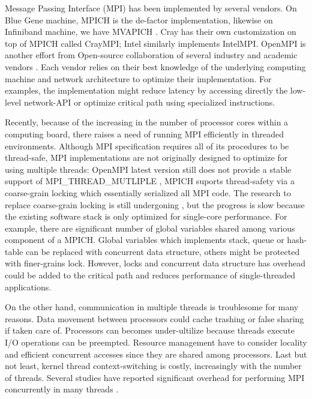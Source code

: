 Message Passing Interface (MPI) has been implemented by several vendors. On
Blue Gene machine, MPICH \cite{mpich} is the de-factor implementation, likewise
on Infiniband machine, we have MVAPICH \cite{mvapich}. Cray has their own
customization on top of MPICH called CrayMPI; Intel similarly implements
IntelMPI. OpenMPI is another effort from Open-source collaboration of several
industry and academic vendors \cite{openMPI}.  Each vendor relies on 
their best knowledge of the underlying computing machine and network
architecture to optimize their implementation. For examples, the implementation
might reduce latency by accessing directly the low-level network-API or
optimize critical path using specialized instructions.

Recently, because of the increasing in the number of processor cores within a
computing board, there raises a need of running MPI efficiently in threaded
environments. Although MPI specification requires all of its procedures to be
thread-safe, MPI implementations are not originally designed to optimize for
using multiple threads: OpenMPI latest version still does not
provide a stable support of MPI\_THREAD\_MUTLIPLE \cite{openmpifr},  MPICH suports thread-safety
via a coarse-grain locking which essentially serialized all MPI code. The
research to replace coarse-grain locking is still undergoning \cite{mpilock}, but the
progress is slow because the existing software stack is only optimized for
single-core performance. For example, there are significant number of global
variables shared among various component of a MPICH. Global variables which
implements stack, queue or hash-table can be replaced with concurrent data
structure, others might be protected with finer-grains lock.  However, locks
and concurrent data structure has overhead could be added to  the critical path
and reduces performance of single-threaded applications.

On the other hand, communication in multiple threads is troublesome for many
reasons. Data movement between processors could cache trashing or false sharing
if taken care of. Processors can becomes under-ultilize because threads execute
I/O operations can be preempted. Resource management have to consider locality
and efficient concurrent accesses since they are shared among processors. Last
but not least, kernel thread context-switching is costly, increasingly with the
number of threads. Several studies have reported significant overhead for
performing MPI concurrently in many threads \cite{threadissue, mpilock}.

